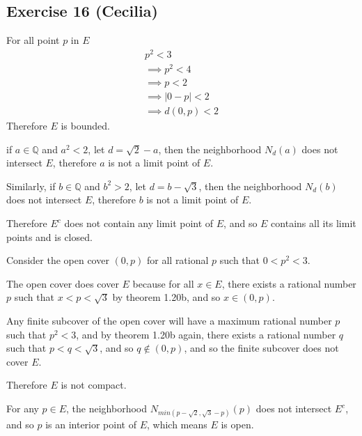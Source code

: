 \subsection*{Exercise 16 (Cecilia)}
For all point $ p $ in $ E $
\begin{eqnarray*}
  p^2 < 3 \\
  \implies p^2 < 4 \\
  \implies p < 2 \\
  \implies |0 - p| < 2 \\
  \implies d(0, p) < 2
\end{eqnarray*}
Therefore $ E $ is bounded.

if $ a \in \mathbb{Q} $ and $ a^2 < 2 $, let $ d = \sqrt{2} - a $, then the neighborhood $ N_d(a) $ does not intersect $ E $, therefore $ a $ is not a limit point of $ E $.

Similarly, if $ b \in \mathbb{Q} $ and $ b^2 > 2 $, let $ d = b - \sqrt{3} $, then the neighborhood $ N_d(b) $ does not intersect $ E $, therefore $ b $ is not a limit point of $ E $.

Therefore $ E^c $ does not contain any limit point of $ E $, and so $ E $ contains all its limit points and is closed.

Consider the open cover $ (0, p) $ for all rational $ p $ such that $ 0 < p^2 < 3 $. 

The open cover does cover $ E $ because for all $ x \in E $, there exists a rational number $ p $ such that $ x < p < \sqrt{3} $ by theorem 1.20b, and so $ x \in (0, p) $.

Any finite subcover of the open cover will have a maximum rational number $ p $ such that $ p^2 < 3 $, and by theorem 1.20b again, there exists a rational number $ q $ such that $ p < q < \sqrt{3} $, and so $ q \notin (0, p) $, and so the finite subcover does not cover $ E $.

Therefore $ E $ is not compact.

For any $ p \in E $, the neighborhood $ N_{min(p-\sqrt{2}, \sqrt{3}-p)}(p) $ does not intersect $ E^c $, and so $ p $ is an interior point of $ E $, which means $ E $ is open.
